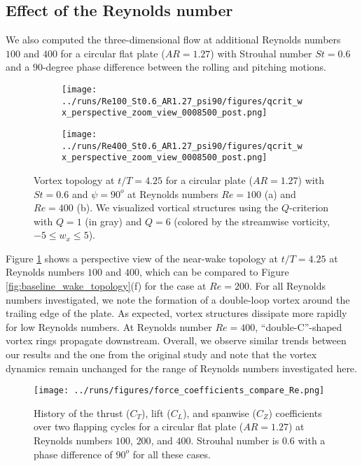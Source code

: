 \subsection{Effect of the Reynolds number}

We also computed the three-dimensional flow at additional Reynolds numbers $100$ and $400$ for a circular flat plate ($AR = 1.27$) with Strouhal number $St = 0.6$ and a $90$-degree phase difference between the rolling and pitching motions.

\begin{figure}
  \centering
  \begin{subfigure}[c]{0.45\textwidth}
    \centering
    \texttt{[image: ../runs/Re100\_St0.6\_AR1.27\_psi90/figures/qcrit\_wx\_perspective\_zoom\_view\_0008500\_post.png]}
    \caption{}
  \end{subfigure}
  \hfill
  \begin{subfigure}[c]{0.45\textwidth}
    \centering
    \texttt{[image: ../runs/Re400\_St0.6\_AR1.27\_psi90/figures/qcrit\_wx\_perspective\_zoom\_view\_0008500\_post.png]}
    \caption{}
  \end{subfigure}
  \caption{Vortex topology at $t / T = 4.25$ for a circular plate ($AR = 1.27$) with $St = 0.6$ and $\psi = 90^o$ at Reynolds numbers $Re = 100$ (a) and $Re = 400$ (b). We visualized vortical structures using the $Q$-criterion with $Q = 1$ (in gray) and $Q = 6$ (colored by the streamwise vorticity, $-5 \leq w_x \leq 5$).}
  \label{fig:reynolds_wake_topology}
\end{figure}

Figure \ref{fig:reynolds_wake_topology} shows a perspective view of the near-wake topology at $t/T = 4.25$ at Reynolds numbers $100$ and $400$, which can be compared to Figure \ref{fig:baseline_wake_topology}(f) for the case at $Re = 200$.
For all Reynolds numbers investigated, we note the formation of a double-loop vortex around the trailing edge of the plate.
As expected, vortex structures dissipate more rapidly for low Reynolds numbers.
At Reynolds number $Re = 400$, ``double-C''-shaped vortex rings propagate downstream.
Overall, we observe similar trends between our results and the one from the original study and note that the vortex dynamics remain unchanged for the range of Reynolds numbers investigated here.

\begin{figure}
  \centering
  \texttt{[image: ../runs/figures/force\_coefficients\_compare\_Re.png]}
  \caption{History of the thrust ($C_T$), lift ($C_L$), and spanwise ($C_Z$) coefficients over two flapping cycles for a circular flat plate ($AR = 1.27$) at Reynolds numbers $100$, $200$, and $400$. Strouhal number is $0.6$ with a phase difference of $90^o$ for all these cases.}
  \label{fig:reynolds_force_coefficients}
\end{figure}

